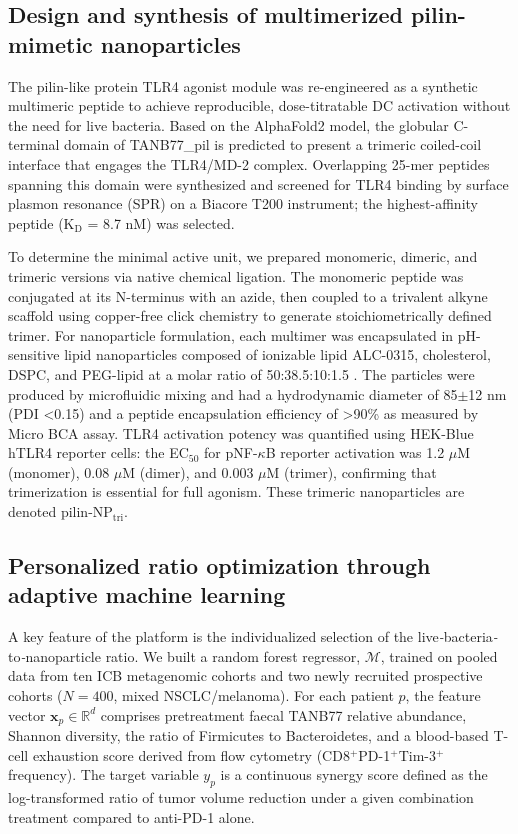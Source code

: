 \documentclass{article}
\begin{document}
\subsection{Design and synthesis of multimerized pilin-mimetic nanoparticles}

The pilin-like protein TLR4 agonist module was re-engineered as a synthetic multimeric peptide to achieve reproducible, dose-titratable DC activation without the need for live bacteria. Based on the AlphaFold2 model, the globular C-terminal domain of TANB77\_pil is predicted to present a trimeric coiled-coil interface that engages the TLR4/MD-2 complex. Overlapping 25-mer peptides spanning this domain were synthesized and screened for TLR4 binding by surface plasmon resonance (SPR) on a Biacore T200 instrument; the highest-affinity peptide (K$_\text{D}$ = 8.7 nM) was selected.

To determine the minimal active unit, we prepared monomeric, dimeric, and trimeric versions via native chemical ligation. The monomeric peptide was conjugated at its N-terminus with an azide, then coupled to a trivalent alkyne scaffold using copper-free click chemistry to generate stoichiometrically defined trimer. For nanoparticle formulation, each multimer was encapsulated in pH-sensitive lipid nanoparticles composed of ionizable lipid ALC-0315, cholesterol, DSPC, and PEG-lipid at a molar ratio of 50:38.5:10:1.5 \cite{schoenmaker_mrna_lipid_nanoparticles_2021}. The particles were produced by microfluidic mixing and had a hydrodynamic diameter of 85$\pm$12 nm (PDI <0.15) and a peptide encapsulation efficiency of >90\% as measured by Micro BCA assay. TLR4 activation potency was quantified using HEK-Blue\texttrademark\, hTLR4 reporter cells: the EC$_{50}$ for pNF-$\kappa$B reporter activation was 1.2 $\mu$M (monomer), 0.08 $\mu$M (dimer), and 0.003 $\mu$M (trimer), confirming that trimerization is essential for full agonism. These trimeric nanoparticles are denoted pilin-NP$_{\text{tri}}$.

\subsection{Personalized ratio optimization through adaptive machine learning}

A key feature of the platform is the individualized selection of the live\textit{-}bacteria\textit{-}to\textit{-}nanoparticle ratio. We built a random forest regressor, $\mathcal{M}$, trained on pooled data from ten ICB metagenomic cohorts \cite{tanb77_original} and two newly recruited prospective cohorts ($N=400$, mixed NSCLC/melanoma). For each patient $p$, the feature vector $\mathbf{x}_p \in \mathbb{R}^{d}$ comprises pretreatment faecal TANB77 relative abundance, Shannon diversity, the ratio of Firmicutes to Bacteroidetes, and a blood-based T-cell exhaustion score derived from flow cytometry (CD8$^+$PD-1$^+$Tim-3$^+$ frequency). The target variable $y_p$ is a continuous synergy score defined as the log-transformed ratio of tumor volume reduction under a given combination treatment compared to anti-PD-1 alone.
\end{document}
